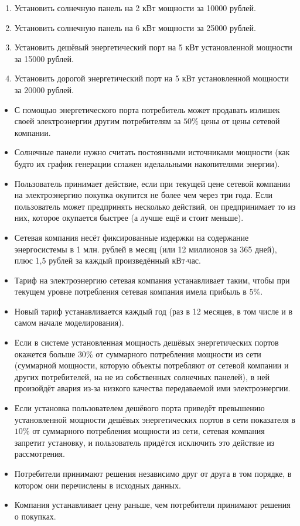 \begin{enumerate}
    \item Установить солнечную панель на 2 кВт мощности за 10000 рублей.
    \item Установить солнечную панель на 6 кВт мощности за 25000 рублей.
    \item Установить дешёвый энергетический порт на 5 кВт установленной мощности за 15000 рублей.
    \item Установить дорогой энергетический порт на 5 кВт установленной мощности за 20000 рублей.    
\end{enumerate}

\begin{itemize}
    \item С помощью энергетического порта потребитель может продавать излишек своей электроэнергии другим потребителям за $50\%$ цены от цены сетевой компании.
    \item Солнечные панели нужно считать постоянными источниками мощности (как будто их график генерации сглажен иделальными накопителями энергии).
    \item Пользователь принимает действие, если при текущей цене сетевой компании на электроэнергию покупка окупится не более чем через три года. Если пользователь может предпринять несколько действий, он предпринимает то из них, которое окупается быстрее (а лучше ещё и стоит меньше).
    \item Сетевая компания несёт фиксированные издержки на содержание энергосистемы в 1 млн. рублей в месяц (или 12 миллионов за 365 дней), плюс 1,5 рублей за каждый произведённый кВт$\cdot$час.
    \item Тариф на электроэнергию сетевая компания устанавливает таким, чтобы при текущем уровне потребления сетевая компания имела прибыль в $5\%$.
    \item Новый тариф устанавливается каждый год (раз в 12 месяцев, в том числе и в самом начале моделирования).
    \item Если в системе установленная мощность дешёвых энергетических портов окажется больше $30\%$ от суммарного потребления мощности из сети (суммарной мощности, которую объекты потребляют от сетевой компании и других потребителей, на не из собственных солнечных панелей), в ней произойдёт авария из-за низкого качества передаваемой ими электроэнергии.
    \item Если установка пользователем дешёвого порта приведёт превышению установленной мощности дешёвых энергетических портов в сети показателя в $10\%$ от суммарного потребления мощности из сети, сетевая компания запретит установку, и пользователь придётся исключить это действие из рассмотрения.
    \item Потребители принимают решения независимо друг от друга в том порядке, в котором они перечислены в исходных данных.
    \item Компания устанавливает цену раньше, чем потребители принимают решения о покупках.
\end{itemize}

